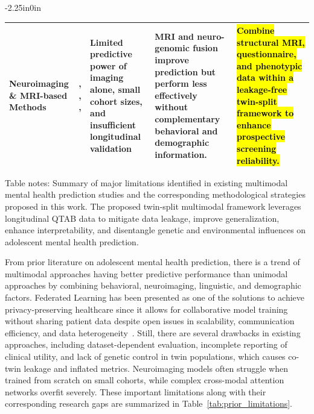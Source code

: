 \documentclass[10pt,letterpaper]{article}
\begin{document}
\begin{table}[!t]
\begin{adjustwidth}{-2.25in}{0in}
\begin{tabular}{|p{2.8cm}|p{2.0cm}|p{3.8cm}|p{4.5cm}|p{4.8cm}|}
Neuroimaging \& MRI-based Methods
& \cite{ref23}, \cite{ref24}, \cite{ref25}, \cite{ref27}
& Limited predictive power of imaging alone, small cohort sizes, and insufficient longitudinal validation
& MRI and neuro-genomic fusion improve prediction but perform less effectively without complementary behavioral and demographic information.
& \hl{Combine structural MRI, questionnaire, and phenotypic data within a leakage-free twin-split framework to enhance prospective screening reliability.} \\
\hline

\end{tabular}

\begin{flushleft}
Table notes: Summary of major limitations identified in existing multimodal mental health prediction studies and the corresponding methodological strategies proposed in this work. The proposed twin-split multimodal framework leverages longitudinal QTAB data to mitigate data leakage, improve generalization, enhance interpretability, and disentangle genetic and environmental influences on adolescent mental health prediction.
\end{flushleft}

\end{adjustwidth}
\end{table}

From prior literature on adolescent mental health prediction, there is a trend of multimodal approaches having better predictive performance than unimodal approaches by combining behavioral, neuroimaging, linguistic, and demographic factors. Federated Learning has been presented as one of the solutions to achieve privacy-preserving healthcare since it allows for collaborative model training without sharing patient data despite open issues in scalability, communication efficiency, and data heterogeneity~\cite{ref66}. Still, there are several drawbacks in existing approaches, including dataset-dependent evaluation, incomplete reporting of clinical utility, and lack of genetic control in twin populations, which causes co-twin leakage and inflated metrics. Neuroimaging models often struggle when trained from scratch on small cohorts, while complex cross-modal attention networks overfit severely. These important limitations along with their corresponding research gaps are summarized in Table~\ref{tab:prior_limitations}.
\end{document}
